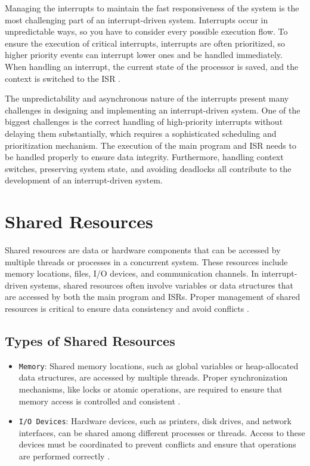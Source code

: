 \documentclass[
fancyheadings, %
%
%
]{stsreprt}
\begin{document}
{Managing the interrupts to maintain the fast responsiveness of the system is the most challenging part of an interrupt-driven system. Interrupts occur in unpredictable ways, so you have to consider every possible execution flow. To ensure the execution of critical interrupts, interrupts are often prioritized, so higher priority events can interrupt lower ones and be handled immediately. When handling an interrupt, the current state of the processor is saved, and the context is switched to the ISR \cite{wang2020}.

The unpredictability and asynchronous nature of the interrupts present many challenges in designing and implementing an interrupt-driven system. One of the biggest challenges is the correct handling of high-priority interrupts without delaying them substantially, which requires a sophisticated scheduling and prioritization mechanism. The execution of the main program and ISR needs to be handled properly to ensure data integrity. Furthermore, handling context switches, preserving system state, and avoiding deadlocks all contribute to the development of an interrupt-driven system.

\section{Shared Resources}
Shared resources are data or hardware components that can be accessed by multiple threads or processes in a concurrent system. These resources include memory locations, files, I/O devices, and communication channels. In interrupt-driven systems, shared resources often involve variables or data structures that are accessed by both the main program and ISRs. Proper management of shared resources is critical to ensure data consistency and avoid conflicts \cite{herlihy2008}.

\subsection{Types of Shared Resources}
\begin{itemize}
	\item \texttt{Memory}: Shared memory locations, such as global variables or heap-allocated data structures, are accessed by multiple threads. Proper synchronization mechanisms, like locks or atomic operations, are required to ensure that memory access is controlled and consistent \cite{herlihy2008}.
	
	\item \texttt{I/O Devices}: Hardware devices, such as printers, disk drives, and network interfaces, can be shared among different processes or threads. Access to these devices must be coordinated to prevent conflicts and ensure that operations are performed correctly \cite{burns2009}.
	

\end{itemize}}
\end{document}
